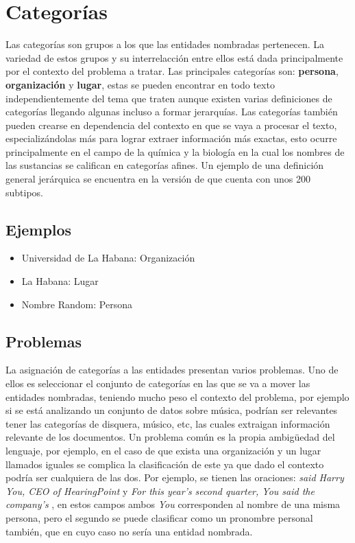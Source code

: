 \documentclass[runningheads]{llncs}
\begin{document}
\section{Categorías}

Las categorías son grupos a los que las entidades nombradas pertenecen. La variedad de estos grupos y su interrelacción entre ellos está dada principalmente por el contexto del problema a tratar. Las principales categorías son: \textbf{persona}, \textbf{organización} y \textbf{lugar}, estas se pueden encontrar en todo texto independientemente del tema que traten aunque existen varias definiciones de categorías llegando algunas incluso a formar jerarquías. Las categorías también pueden crearse en dependencia del contexto en que se vaya a procesar el texto, especializándolas más para lograr extraer información más exactas, esto ocurre principalmente en el campo de la química y la biología en la cual los nombres de las sustancias se califican en categorías afines. Un ejemplo de una definición general jerárquica se encuentra en la versión de \cite{sekine} que cuenta con unos 200 subtipos.

\subsection{Ejemplos}

\begin{itemize}

\item Universidad de La Habana: Organización
\item La Habana: Lugar
\item Nombre Random: Persona %

\end{itemize}

\subsection{Problemas}

La asignación de categorías a las entidades presentan varios problemas. Uno de ellos es seleccionar el conjunto de categorías en las que se va a mover las entidades nombradas, teniendo mucho peso el contexto del problema, por ejemplo si se está analizando un conjunto de datos sobre música, podrían ser relevantes tener las categorías de disquera, músico, etc, las cuales extraigan información relevante de los documentos. Un problema común es la propia ambigüedad del lenguaje, por ejemplo, en el caso de que exista una organización y un lugar llamados iguales se complica la clasificación de este ya que dado el contexto podría ser cualquiera de las dos. Por ejemplo, se tienen las oraciones: \emph{said Harry You, CEO of HearingPoint} y \emph{For this year’s second quarter, You said the
company’s} \cite{semi_sup_for_ner}, en estos campos ambos \emph{You} corresponden al nombre de una misma persona, pero el segundo se puede clasificar como un pronombre personal también, que en cuyo caso no sería una entidad nombrada.
\end{document}
